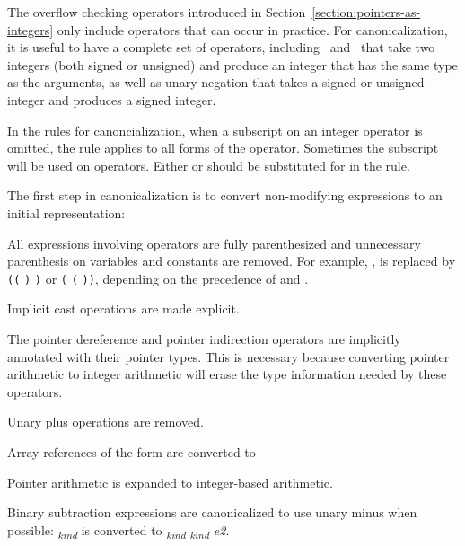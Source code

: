 The overflow checking operators introduced in
Section~\ref{section:pointers-as-integers} only include
operators that can occur in practice. For canonicalization, it is useful
to have a complete set of operators, including
\plusovf\ and \minusovf\ that
take two integers (both signed or unsigned) and produce an integer that
has the same type as the arguments, as well as unary negation that takes
a signed or unsigned integer and produces a signed integer.

In the rules for canoncialization, when a subscript on an integer
operator is omitted, the rule applies to all forms of the operator.
Sometimes the subscript  will be used on operators. Either
 or  should be substituted for 
in the rule.

The first step in canonicalization is to convert non-modifying
expressions to an initial representation:

\begin{compactenum}
\item
  All expressions involving operators are fully parenthesized and
  unnecessary parenthesis on variables and constants are removed. For
  example,     , is
  replaced by \texttt{((}  \texttt{)}
   \texttt{)} or \texttt{(} 
  \texttt{(}  \texttt{))}, depending on the
  precedence of  and .
\item
  Implicit cast operations are made explicit.
\item
  The pointer dereference \code{*} and pointer indirection operators
  \code{(->)} are implicitly annotated with their pointer types.
  This is necessary because converting pointer arithmetic to integer
  arithmetic will erase the type information needed by these operators.
\item
  Unary plus operations are removed.
\item
  Array references of the form
  \code{[}\code{]} are converted to
  \code{*((}\code{)} \code{+}
  \code{(}\code{))}
\item
  Pointer arithmetic is expanded to integer-based arithmetic.
\item
  Binary subtraction expressions are canonicalized to use unary minus
  when possible:  \code{-}\emph{\textsubscript{kind}}
   is converted to 
  \code{+}\emph{\textsubscript{kind}}
  \code{-}\emph{\textsubscript{kind} e2}.
\end{compactenum}

